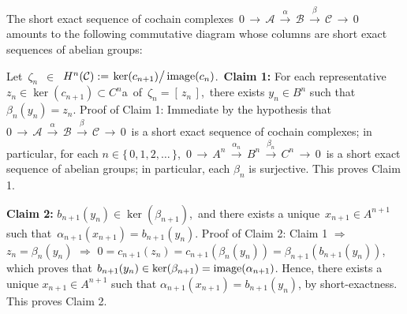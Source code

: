 \proof
The short exact sequence of cochain complexes
\,$0 \,\longrightarrow\, \mathcal{A} \,\overset{\alpha}{\longrightarrow}\, \mathcal{B} \,\overset{\beta}{\longrightarrow}\, \mathcal{C} \,\longrightarrow\, 0$\,
amounts to the following commutative diagram
whose columns are short exact sequences of
abelian groups:
\begin{center}
\end{center}
\vskip 0.25cm
\noindent
Let \,$\zeta_{n}$\, 
$\in$
\,$H^{n}(\mathcal{C}) := \left.\ker(\overset{{\color{white}.}}{c_{n+1}})\right/\image(c_{n})$.\,
\vskip 0.25cm
\noindent
\textbf{Claim 1:}\;\;
For each representative
\,$z_{n} \in \ker(c_{n+1}) \subset C^{n}$a\,
of
\,$\zeta_{n} = \left[\,z_{n}\,\right]$,\,
there exists $y_{n} \in B^{n}$
such that $\beta_{n}(y_{n}) = z_{n}$.
\vskip 0.2cm
\noindent
Proof of Claim 1:
Immediate by the hypothesis that
\,$0 \,\longrightarrow\, \mathcal{A} \,\overset{\alpha}{\longrightarrow}\, \mathcal{B} \,\overset{\beta}{\longrightarrow}\, \mathcal{C} \,\longrightarrow\,0$\,
is a short exact sequence of cochain complexes;
in particular, for each $n \in \{\,0,1,2,\ldots\,\}$,
\,$0 \,\longrightarrow\, A^{n} \,\overset{\alpha_{n}}{\longrightarrow}\, B^{n} \,\overset{\beta_{n}}{\longrightarrow}\, C^{n} \,\longrightarrow\,0$\,
is a short exact sequence of abelian groups;
in particular, each $\beta_{n}$ is surjective.
This proves Claim 1.

\vskip 0.5cm
\noindent
\textbf{Claim 2:}\;\;
$b_{n+1}(y_{n}) \in \ker(\beta_{n+1})$,\, and there exists a unique \,$x_{n+1} \in A^{n+1}$\,
such that \,$\alpha_{n+1}(x_{n+1}) = b_{n+1}(y_{n})$.
\vskip 0.2cm
\noindent
Proof of Claim 2:
Claim 1
\;$\Longrightarrow$\;
\,$z_{n} = \beta_{n}(y_{n})$
\;$\Longrightarrow$\;
$0 = c_{n+1}(z_{n}) = c_{n+1}(\beta_{n}(y_{n})) = \beta_{n+1}(b_{n+1}(y_{n}))$,
which proves that $b_{n+1}(y_{n}) \in \ker(\beta_{n+1}) = \textnormal{image}(\alpha_{n+1})$.
Hence, there exists a unique $x_{n+1} \in A^{n+1}$ such that
$\alpha_{n+1}(x_{n+1}) = b_{n+1}(y_{n})$, by short-exactness.
This proves Claim 2.

